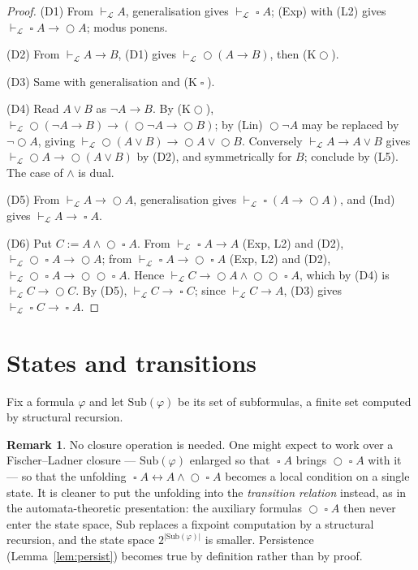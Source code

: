 \documentclass[11pt,a4paper]{article}
\theoremstyle{definition}
\newtheorem{remark}[theorem]{Remark}
\newcommand{\Next}{\mathop{\bigcirc}}
\newcommand{\Always}{\mathop{\square}}
\newcommand{\Sub}{\mathrm{Sub}}
\newcommand{\proves}{\vdash_{\mathcal{L}}}
\begin{document}
\begin{proof}
(D1) From $\proves A$, generalisation gives $\proves\Always A$; (Exp) with (L2)
gives $\proves\Always A\to\Next A$; modus ponens.

(D2) From $\proves A\to B$, (D1) gives $\proves\Next(A\to B)$, then
(K$\Next$).

(D3) Same with generalisation and (K$\Always$).

(D4) Read $A\vee B$ as $\neg A\to B$.  By (K$\Next$),
$\proves\Next(\neg A\to B)\to(\Next\neg A\to\Next B)$; by (Lin) $\Next\neg A$
may be replaced by $\neg\Next A$, giving
$\proves\Next(A\vee B)\to\Next A\vee\Next B$.  Conversely
$\proves A\to A\vee B$ gives $\proves\Next A\to\Next(A\vee B)$ by (D2), and
symmetrically for $B$; conclude by (L5).  The case of $\wedge$ is dual.

(D5) From $\proves A\to\Next A$, generalisation gives
$\proves\Always(A\to\Next A)$, and (Ind) gives $\proves A\to\Always A$.

(D6) Put $C:=A\wedge\Next\Always A$.  From $\proves\Always A\to A$ (Exp, L2)
and (D2), $\proves\Next\Always A\to\Next A$; from
$\proves\Always A\to\Next\Always A$ (Exp, L2) and (D2),
$\proves\Next\Always A\to\Next\Next\Always A$.  Hence
$\proves C\to\Next A\wedge\Next\Next\Always A$, which by (D4) is
$\proves C\to\Next C$.  By (D5), $\proves C\to\Always C$; since
$\proves C\to A$, (D3) gives $\proves\Always C\to\Always A$.
\end{proof}

\section{States and transitions}

Fix a formula $\varphi$ and let $\Sub(\varphi)$ be its set of subformulas, a
finite set computed by structural recursion.

\begin{remark}
No closure operation is needed.  One might expect to work over a
Fischer--Ladner closure --- $\Sub(\varphi)$ enlarged so that
$\Always A$ brings $\Next\Always A$ with it --- so that the unfolding
$\Always A\leftrightarrow A\wedge\Next\Always A$ becomes a local condition on a
single state.  It is cleaner to put the unfolding into the \emph{transition
relation} instead, as in the automata-theoretic presentation: the auxiliary
formulas $\Next\Always A$ then never enter the state space, $\Sub$ replaces a
fixpoint computation by a structural recursion, and the state space
$2^{|\Sub(\varphi)|}$ is smaller.  Persistence (Lemma~\ref{lem:persist}) becomes
true by definition rather than by proof.
\end{remark}
\end{document}
